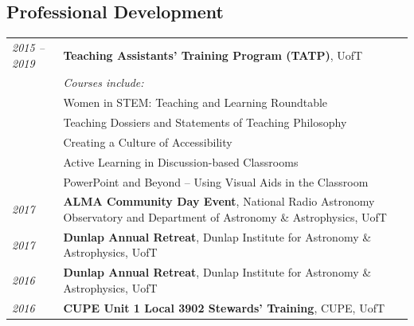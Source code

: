 \documentclass[10pt]{res} %
\begin{document}
\begin{resume}

\section{\Large Professional Development}
\vspace{-5pt} %
\noindent\makebox[\linewidth]{\rule{\textwidth}{0.4pt}}
\vspace{-20pt} %

\begin{table}[h!]
\begin{tabularx}{\textwidth}{lX}
\textit{2015 -- 2019}  & \textbf{Teaching Assistants' Training Program (TATP)}, UofT \\
				& \textit{Courses include:} \\
                                  & Women in STEM: Teaching and Learning Roundtable \\
                                  & Teaching Dossiers and Statements of Teaching Philosophy \\
                                  & Creating a Culture of Accessibility \\
                                  & Active Learning in Discussion-based Classrooms \\
                                  & PowerPoint and Beyond -- Using Visual Aids in the Classroom \\
\textit{2017} & \textbf{ALMA Community Day Event}, National Radio Astronomy Observatory and Department of Astronomy \& Astrophysics, UofT \\
\textit{2017} & \textbf{Dunlap Annual Retreat}, Dunlap Institute for Astronomy \& Astrophysics, UofT \\
\textit{2016} & \textbf{Dunlap Annual Retreat}, Dunlap Institute for Astronomy \& Astrophysics, UofT \\
\textit{2016} & \textbf{CUPE Unit 1 Local 3902 Stewards' Training}, CUPE, UofT
\end{tabularx}
\end{table}



\end{resume}
\end{document}
